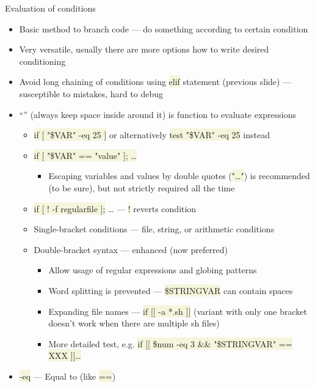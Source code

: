 \documentclass[compress, xelatex, 11pt, xcolor=svgnames, aspectratio=169,
	hyperref={
		bookmarks=true,
		unicode=true,
		colorlinks=true,
		pdftitle={Linux, command line and MetaCentrum},
		plainpages=false,
		pdfauthor={Vojtech Zeisek},
		pdfsubject={Course about use of Linux command line, writing shell scripts and using MetaCentrum of CESNET},
		pdfcreator={XeLaTeX},
		pdfkeywords={Linux, GNU, BASH, shell, command line, MetaCentrum},
		linkcolor=DarkRed, %
		anchorcolor=DarkBlue, %
		citecolor=Indigo, %
		filecolor=NavyBlue, %
		menucolor=DarkMagenta, %
		urlcolor=DarkBlue, %
		},
	url={hyphens, lowtilde} %
	]{beamer}
\renewcommand{\texttt}[1]{\colorbox{Beige}{{\ttfamily #1}}}
\begin{document}
\begin{frame}[allowframebreaks]{Evaluation of conditions}
	\begin{itemize}
		\item Basic method to branch code --- do something according to certain condition
		\item Very versatile, usually there are more options how to write desired conditioning
		\item Avoid long chaining of conditions using \texttt{elif} statement (previous slide) --- susceptible to mistakes, hard to debug
		\item \enquote{\texttt{[~\ldots~]}} (always keep space inside around it) is function to evaluate expressions
		\begin{itemize}
			\item \texttt{if [ "\$\textbraceleft VAR\textbraceright" -eq 25 ]} or alternatively \texttt{test "\$\textbraceleft VAR\textbraceright" -eq 25} instead
			\item \texttt{if [ "\$\textbraceleft VAR\textbraceright" == "value" ]; \ldots}
			\begin{itemize}
				\item Escaping variables and values by double quotes (\texttt{"\ldots"}) is recommended (to be sure), but not strictly required all the time
			\end{itemize}
			\item \texttt{if [ ! -f regularfile ];} \ldots{ }--- \texttt{!} reverts condition
			\item Single-bracket conditions --- file, string, or arithmetic conditions
			\item Double-bracket syntax --- enhanced (now preferred)
			\begin{itemize}
				\item Allow usage of regular expressions and globing patterns
				\item Word splitting is prevented --- \texttt{\textbraceleft \$STRINGVAR} can contain spaces
				\item Expanding file names --- \texttt{if [[ -a *.sh ]]} (variant with only one bracket doesn't work when there are multiple sh files)
				\item More detailed test, e.g. \texttt{if [[ \$num -eq 3 \&\& "\$\textbraceleft STRINGVAR\textbraceright " == XXX ]]\ldots}
			\end{itemize}
		\end{itemize}
		\item \texttt{-eq} --- Equal to (like \texttt{==})

\end{itemize}
\end{frame}
\end{document}

